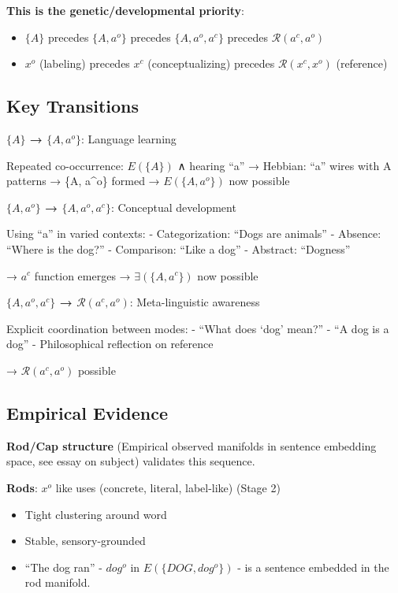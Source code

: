 \documentclass[12pt]{article}
\providecommand{\tightlist}{}   %
\begin{document}
\textbf{This is the genetic/developmental priority}:

\begin{itemize}
\tightlist
\item
  \(\{A\}\) precedes \(\{A, a^o\}\) precedes \(\{A, a^o, a^c\}\) precedes \(\mathcal{R}(a^c, a^o)\)
\item
  \(x^o\) (labeling) precedes \(x^c\) (conceptualizing) precedes \(\mathcal{R}(x^c, x^o)\) (reference)
\end{itemize}

\subsection{Key Transitions}\label{key-transitions}

\textbf{\(\{A\}\) → \(\{A, a^o\}\)}: Language learning

Repeated co-occurrence: \(E(\{A\})\) ∧ hearing ``a'' → Hebbian: ``a'' wires with A patterns → \{A, a\^{}o\} formed → \(E(\{A, a^o\})\) now possible

\textbf{\(\{A, a^o\}\) → \(\{A, a^o, a^c\}\)}: Conceptual development

Using ``a'' in varied contexts: - Categorization: ``Dogs are animals'' - Absence: ``Where is the dog?'' - Comparison: ``Like a dog'' - Abstract: ``Dogness''

→ \(a^c\) function emerges → \(\exists(\{A, a^c\})\) now possible

\textbf{\(\{A, a^o, a^c\}\) → \(\mathcal{R}(a^c, a^o)\)}: Meta-linguistic awareness

Explicit coordination between modes: - ``What does `dog' mean?'' - ``A dog is a dog'' - Philosophical reflection on reference

→ \(\mathcal{R}(a^c, a^o)\) possible

\subsection{Empirical Evidence}\label{empirical-evidence}

\textbf{Rod/Cap structure} (Empirical observed manifolds in sentence embedding space, see essay on subject) validates this sequence.

\textbf{Rods}: \(x^o\) like uses (concrete, literal, label-like) (Stage 2)

\begin{itemize}
\tightlist
\item
  Tight clustering around word
\item
  Stable, sensory-grounded
\item
  ``The dog ran'' - \(dog^o\) in \(E(\{DOG, dog^o\})\) - is a sentence embedded in the rod manifold.
\end{itemize}
\end{document}

